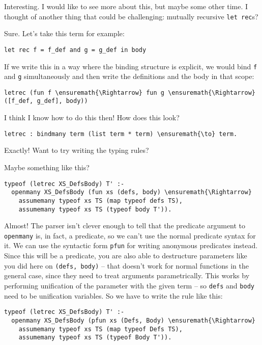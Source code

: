 \heroSTUDENT{} Interesting. I would like to see more about this, but maybe
some other time. I thought of another thing that could be challenging:
mutually recursive \texttt{let\ rec}s?

\heroADVISOR{} Sure. Let's take this term for example:

\begin{verbatim}
let rec f = f_def and g = g_def in body
\end{verbatim}

If we write this in a way where the binding structure is explicit, we
would bind \texttt{f} and \texttt{g} simultaneously and then write the
definitions and the body in that scope:

\begin{verbatim}
letrec (fun f \ensuremath{\Rightarrow} fun g \ensuremath{\Rightarrow} ([f_def, g_def], body))
\end{verbatim}

\heroSTUDENT{} I think I know how to do this then! How does this look?

\begin{verbatim}
letrec : bindmany term (list term * term) \ensuremath{\to} term.
\end{verbatim}

\heroADVISOR{} Exactly! Want to try writing the typing rules?

\heroSTUDENT{} Maybe something like this?

\begin{verbatim}
typeof (letrec XS_DefsBody) T' :-
  openmany XS_DefsBody (fun xs (defs, body) \ensuremath{\Rightarrow}
    assumemany typeof xs TS (map typeof defs TS),
    assumemany typeof xs TS (typeof body T')).
\end{verbatim}

\heroADVISOR{} Almost! The parser isn't clever enough to tell that the
predicate argument to \texttt{openmany} is, in fact, a predicate, so we
can't use the normal predicate syntax for it. We can use the syntactic
form \texttt{pfun} for writing anonymous predicates instead. Since this
will be a predicate, you are also able to destructure parameters like
you did here on \texttt{(defs,\ body)} -- that doesn't work for normal
functions in the general case, since they need to treat arguments
parametrically. This works by performing unification of the parameter
with the given term -- so \texttt{defs} and \texttt{body} need to be
unification variables. So we have to write the rule like this:

\begin{verbatim}
typeof (letrec XS_DefsBody) T' :-
  openmany XS_DefsBody (pfun xs (Defs, Body) \ensuremath{\Rightarrow}
    assumemany typeof xs TS (map typeof Defs TS),
    assumemany typeof xs TS (typeof Body T')).
\end{verbatim}

